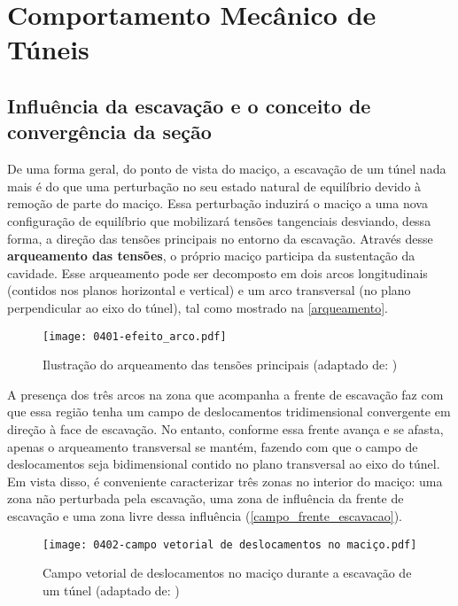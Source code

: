 \chapter{Comportamento Mecânico de Túneis}

\section{Influência da escavação e o conceito de convergência da seção}

De uma forma geral, do ponto de vista do maciço, a escavação de um túnel nada mais é do que uma perturbação no seu estado natural de equilíbrio devido à remoção de parte do maciço. Essa perturbação induzirá o maciço a uma nova configuração de equilíbrio que mobilizará tensões tangenciais desviando, dessa forma, a direção das tensões principais no entorno da escavação. Através desse \textbf{arqueamento das tensões}, o próprio maciço participa da sustentação da cavidade. Esse arqueamento pode ser decomposto em dois arcos longitudinais (contidos nos planos horizontal e vertical) e um arco transversal (no plano perpendicular ao eixo do túnel), tal como mostrado na \autoref{arqueamento}.

\begin{figure}[H]
	\begin{center}
		\texttt{[image: 0401-efeito\_arco.pdf]}
	\end{center}
	\caption{\label{arqueamento}Ilustração do arqueamento das tensões principais (adaptado de: )}
\end{figure}

A presença dos três arcos na zona que acompanha a frente de escavação faz com que essa região tenha um campo de deslocamentos tridimensional convergente em direção à face de escavação. No entanto, conforme essa frente avança e se afasta, apenas o arqueamento transversal se mantém, fazendo com que o campo de deslocamentos seja bidimensional contido no plano transversal ao eixo do túnel. Em vista disso, é conveniente caracterizar três zonas no interior do maciço: uma zona não perturbada pela escavação, uma zona de influência da frente de escavação e uma zona livre dessa influência (\autoref{campo_frente_escavacao}).

\begin{figure}[H]
	\begin{center}
		\texttt{[image: 0402-campo vetorial de deslocamentos no maciço.pdf]}
	\end{center}
	\caption{\label{campo_frente_escavacao}Campo vetorial de deslocamentos no maciço durante a escavação de um túnel (adaptado de: )}
\end{figure}

